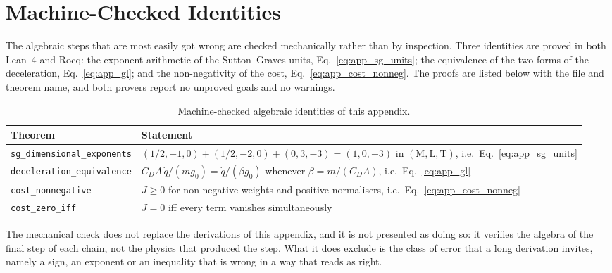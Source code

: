\section{Machine-Checked Identities}
\label{app:machine}

The algebraic steps that are most easily got wrong are checked mechanically rather than by inspection. Three identities are proved in both Lean~4 and Rocq: the exponent arithmetic of the Sutton--Graves units, Eq.~\eqref{eq:app_sg_units}; the equivalence of the two forms of the deceleration, Eq.~\eqref{eq:app_gl}; and the non-negativity of the cost, Eq.~\eqref{eq:app_cost_nonneg}. The proofs are listed below with the file and theorem name, and both provers report no unproved goals and no warnings.

\begin{table}[H]
\centering
\caption{Machine-checked algebraic identities of this appendix.}
\label{tab:app_proofs}
\begin{tabularx}{\textwidth}{@{}>{\RaggedRight\arraybackslash}p{} >{\RaggedRight\arraybackslash}X@{}}
\toprule
\textbf{Theorem} & \textbf{Statement} \\
\midrule
\texttt{sg\_dimensional\_exponents} & $(1/2,-1,0) + (1/2,-2,0) + (0,3,-3) = (1,0,-3)$ in $(\mathrm{M},\mathrm{L},\mathrm{T})$, i.e.\ Eq.~\eqref{eq:app_sg_units} \\
\texttt{deceleration\_equivalence} & $C_DA\,\dot{q}/(m g_0) = \dot{q}/(\beta g_0)$ whenever $\beta = m/(C_DA)$, i.e.\ Eq.~\eqref{eq:app_gl} \\
\texttt{cost\_nonnegative} & $J \ge 0$ for non-negative weights and positive normalisers, i.e.\ Eq.~\eqref{eq:app_cost_nonneg} \\
\texttt{cost\_zero\_iff} & $J = 0$ iff every term vanishes simultaneously \\
\bottomrule
\end{tabularx}
\end{table}

\noindent The mechanical check does not replace the derivations of this appendix, and it is not presented as doing so: it verifies the algebra of the final step of each chain, not the physics that produced the step. What it does exclude is the class of error that a long derivation invites, namely a sign, an exponent or an inequality that is wrong in a way that reads as right.
